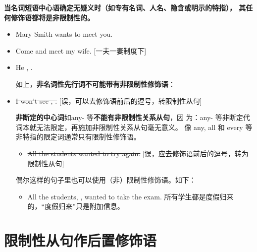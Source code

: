 \textbf{当名词短语中心语确定无疑义时（如专有名词、人名、隐含或明示的特指），
  其任何修饰语都将是非限制性的。}
\begin{itemize}
\item Mary Smith wants to meet you.
\item Come and meet my  wife. [一夫一妻制度下]


\item He , .

  如上，\textbf{非名词性先行词不可能带有非限制性修饰语}：


\item \sout{I won't see , .} [误，可以去修饰语前后的逗号，转限制性从句]

  \textbf{非断定的中心词}如any- 等\textbf{不能有非限制性关系从句}，因
  为：any- 等非断定代词本就无法限定，再施加非限制性关系从句毫无意义。
  像 any, all 和 every 等非特指的限定词通常只有限制性修饰语。

  \begin{itemize}
  \item \sout{All the students wanted to
      try again.} [误，应去修饰语前后的逗号，转为限制性从句]

  \end{itemize}

  偶尔这样的句子里也可以使用（非）限制性修饰语。如下：
  \begin{itemize}
  \item All the students, , wanted
    to take the exam.
    所有学生都是度假归来的，“度假归来”只是附加信息。
  \end{itemize}

\end{itemize}

\section{限制性从句作后置修饰语}

